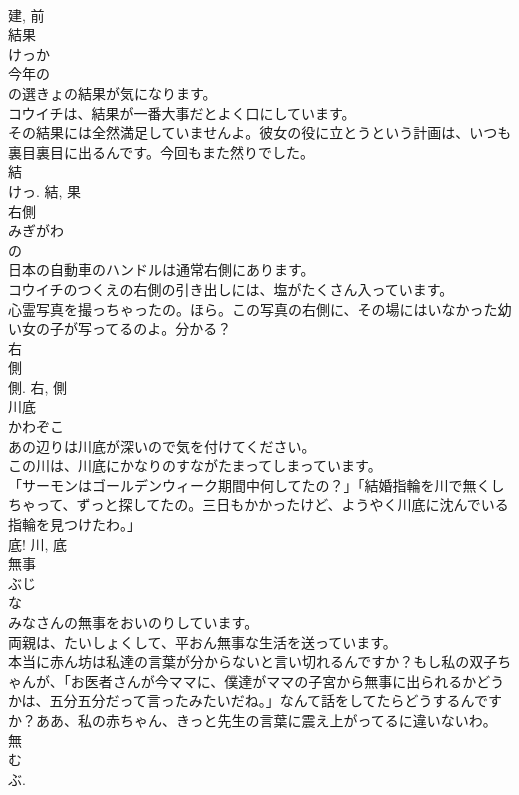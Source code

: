 \documentclass[8pt]{extreport}
\begin{document}
\begin{CJK}{UTF8}{min}
\\	建, 前	
\\	結果	
\\	けっか	
\\	今年の
\\	の選きょの結果が気になります。	
\\	コウイチは、結果が一番大事だとよく口にしています。	
\\	その結果には全然満足していませんよ。彼女の役に立とうという計画は、いつも裏目裏目に出るんです。今回もまた然りでした。	
\\	結 
\\	けっ.	結, 果	
\\	右側	
\\	みぎがわ	
\\	の 
\\	日本の自動車のハンドルは通常右側にあります。	
\\	コウイチのつくえの右側の引き出しには、塩がたくさん入っています。	
\\	心霊写真を撮っちゃったの。ほら。この写真の右側に、その場にはいなかった幼い女の子が写ってるのよ。分かる？	
\\	右 
\\	側 
\\	側.	右, 側	
\\	川底	
\\	かわぞこ	
\\	あの辺りは川底が深いので気を付けてください。	
\\	この川は、川底にかなりのすながたまってしまっています。	
\\	「サーモンはゴールデンウィーク期間中何してたの？」「結婚指輪を川で無くしちゃって、ずっと探してたの。三日もかかったけど、ようやく川底に沈んでいる指輪を見つけたわ。」	
\\	底!	川, 底	
\\	無事	
\\	ぶじ	
\\	な 
\\	みなさんの無事をおいのりしています。	
\\	両親は、たいしょくして、平おん無事な生活を送っています。	
\\	本当に赤ん坊は私達の言葉が分からないと言い切れるんですか？もし私の双子ちゃんが、「お医者さんが今ママに、僕達がママの子宮から無事に出られるかどうかは、五分五分だって言ったみたいだね。」なんて話をしてたらどうするんですか？ああ、私の赤ちゃん、きっと先生の言葉に震え上がってるに違いないわ。	
\\	無 
\\	む 
\\	ぶ. 

\end{CJK}
\end{document}
